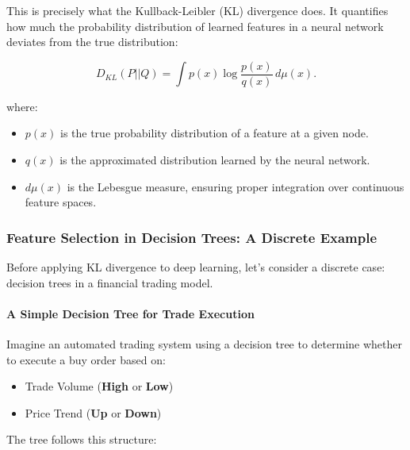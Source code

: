 This is precisely what the Kullback-Leibler (KL) divergence does. It quantifies how much the probability distribution of learned features in a neural network deviates from the true distribution:

\[
D_{KL}(P || Q) = \int p(x) \log \frac{p(x)}{q(x)} \, d\mu(x).
\]

where:
\begin{itemize}
    \item \( p(x) \) is the true probability distribution of a feature at a given node.
    \item \( q(x) \) is the approximated distribution learned by the neural network.
    \item \( d\mu(x) \) is the Lebesgue measure, ensuring proper integration over continuous feature spaces.
\end{itemize}

\subsubsection*{Feature Selection in Decision Trees: A Discrete Example}

Before applying KL divergence to deep learning, let’s consider a discrete case: decision trees in a financial trading model.

\paragraph{A Simple Decision Tree for Trade Execution}

Imagine an automated trading system using a decision tree to determine whether to execute a buy order based on:

\begin{itemize}
    \item Trade Volume (\textbf{High} or \textbf{Low})
    \item Price Trend (\textbf{Up} or \textbf{Down})
\end{itemize}

The tree follows this structure:

\begin{center}
\end{center}

